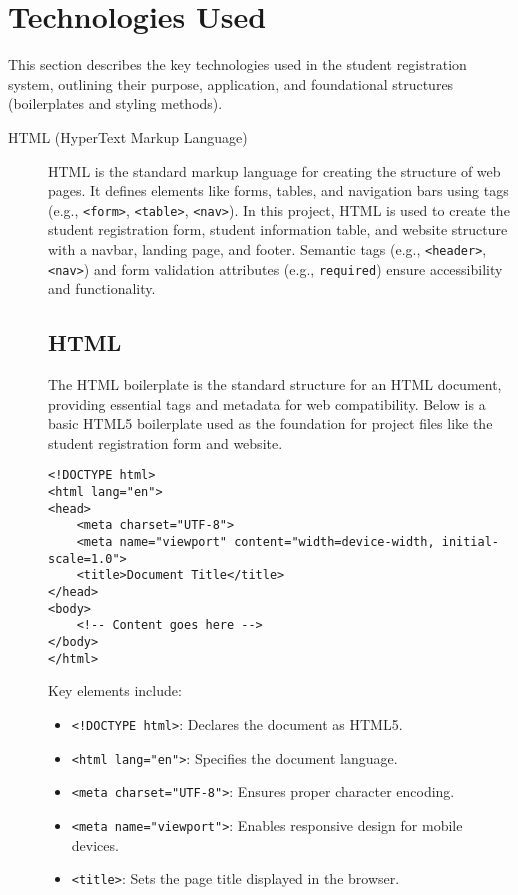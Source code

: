 \section{Technologies Used}
This section describes the key technologies used in the student registration system, outlining their purpose, application, and foundational structures (boilerplates and styling methods).

\begin{description}
    \item[HTML (HyperText Markup Language)] HTML is the standard markup language for creating the structure of web pages. It defines elements like forms, tables, and navigation bars using tags (e.g., \texttt{<form>}, \texttt{<table>}, \texttt{<nav>}). In this project, HTML is used to create the student registration form, student information table, and website structure with a navbar, landing page, and footer. Semantic tags (e.g., \texttt{<header>}, \texttt{<nav>}) and form validation attributes (e.g., \texttt{required}) ensure accessibility and functionality.

    \subsection{HTML}
    The HTML boilerplate is the standard structure for an HTML document, providing essential tags and metadata for web compatibility. Below is a basic HTML5 boilerplate used as the foundation for project files like the student registration form and website.

    \lstset{language=HTML}
    \begin{lstlisting}
<!DOCTYPE html>
<html lang="en">
<head>
    <meta charset="UTF-8">
    <meta name="viewport" content="width=device-width, initial-scale=1.0">
    <title>Document Title</title>
</head>
<body>
    <!-- Content goes here -->
</body>
</html>
    \end{lstlisting}
    Key elements include:
    \begin{itemize}
        \item \texttt{<!DOCTYPE html>}: Declares the document as HTML5.
        \item \texttt{<html lang="en">}: Specifies the document language.
        \item \texttt{<meta charset="UTF-8">}: Ensures proper character encoding.
        \item \texttt{<meta name="viewport">}: Enables responsive design for mobile devices.
        \item \texttt{<title>}: Sets the page title displayed in the browser.
    \end{itemize}


\end{description}
